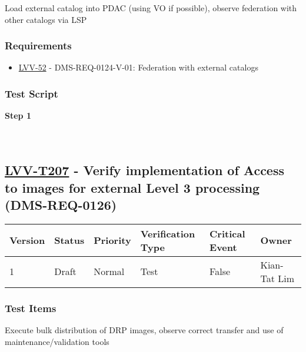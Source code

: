 Load external catalog into PDAC (using VO if possible), observe
federation with other catalogs via LSP

\hypertarget{requirements-106}{%
\subsubsection{Requirements}\label{requirements-106}}

\begin{itemize}
\tightlist
\item
  \href{https://jira.lsstcorp.org/browse/LVV-52}{LVV-52} -
  DMS-REQ-0124-V-01: Federation with external catalogs
\end{itemize}

\hypertarget{test-script-106}{%
\subsubsection{Test Script}\label{test-script-106}}

\textbf{Step 1}\\
~\\
~\\

\hypertarget{lvv-t207---verify-implementation-of-access-to-images-for-external-level-3-processing-dms-req-0126}{%
\subsection{\texorpdfstring{\href{https://jira.lsstcorp.org/secure/Tests.jspa\#/testCase/LVV-T207}{LVV-T207}
- Verify implementation of Access to images for external Level 3
processing
(DMS-REQ-0126)}{LVV-T207 - Verify implementation of Access to images for external Level 3 processing (DMS-REQ-0126)}}\label{lvv-t207---verify-implementation-of-access-to-images-for-external-level-3-processing-dms-req-0126}}

\begin{longtable}[]{@{}llllll@{}}
\toprule
Version & Status & Priority & Verification Type & Critical Event &
Owner\tabularnewline
\midrule
\endhead
1 & Draft & Normal & Test & False & Kian-Tat Lim\tabularnewline
\bottomrule
\end{longtable}

\hypertarget{test-items-107}{%
\subsubsection{Test Items}\label{test-items-107}}

Execute bulk distribution of DRP images, observe correct transfer and
use of maintenance/validation tools


